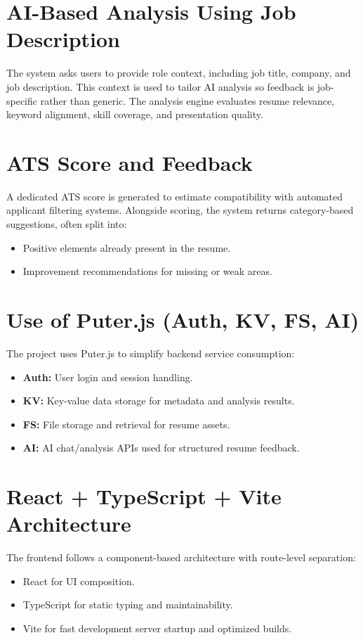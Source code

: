 \documentclass[12pt,a4paper]{report}
\begin{document}
\section{AI-Based Analysis Using Job Description}
The system asks users to provide role context, including job title, company, and job description. This context is used to tailor AI analysis so feedback is job-specific rather than generic. The analysis engine evaluates resume relevance, keyword alignment, skill coverage, and presentation quality.

\section{ATS Score and Feedback}
A dedicated ATS score is generated to estimate compatibility with automated applicant filtering systems. Alongside scoring, the system returns category-based suggestions, often split into:
\begin{itemize}[leftmargin=1.2cm]
    \item Positive elements already present in the resume.
    \item Improvement recommendations for missing or weak areas.
\end{itemize}

\section{Use of Puter.js (Auth, KV, FS, AI)}
The project uses Puter.js to simplify backend service consumption:
\begin{itemize}[leftmargin=1.2cm]
    \item \textbf{Auth:} User login and session handling.
    \item \textbf{KV:} Key-value data storage for metadata and analysis results.
    \item \textbf{FS:} File storage and retrieval for resume assets.
    \item \textbf{AI:} AI chat/analysis APIs used for structured resume feedback.
\end{itemize}

\section{React + TypeScript + Vite Architecture}
The frontend follows a component-based architecture with route-level separation:
\begin{itemize}[leftmargin=1.2cm]
    \item React for UI composition.
    \item TypeScript for static typing and maintainability.
    \item Vite for fast development server startup and optimized builds.
\end{itemize}
\end{document}
